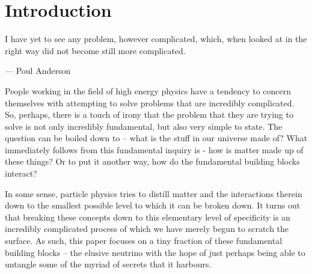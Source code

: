 \section{Introduction}

I have yet to see any problem, however complicated, which, when looked at in the right way did not become still more complicated.

\begin{flushright}--- Poul Anderson\end{flushright}

People working in the field of high energy physics have a tendency to concern themselves with attempting to solve problems that are incredibly complicated.
So, perhaps, there is a touch of irony that the problem that they are trying to solve is not only incredibly fundamental, but also very simple to state.
The question can be boiled down to -- what is the stuff in our universe made of?
What immediately follows from this fundamental inquiry is - how is matter made up of these things? Or to put it another way, how do the fundamental building blocks interact?

In some sense, particle physics tries to distill matter and the interactions therein down to the smallest possible level to which it can be broken down.
It turns out that breaking these concepts down to this elementary level of specificity is an incredibly complicated process of which we have merely begun to scratch the surface.  As such, this paper focuses on a tiny fraction of these fundamental building blocks -- the elusive neutrino with the hope of just perhaps being able to untangle some of the myriad of secrets that it harbours.



% 

% 

% 

% 

% 

% 

% 

% 











